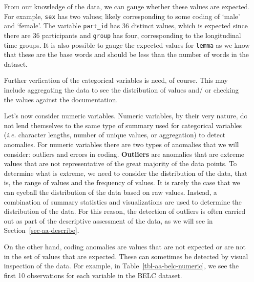 \documentclass[
  letterpaper,
  DIV=11,
  numbers=noendperiod]{scrreport}
\theoremstyle{definition}
\theoremstyle{remark}
\begin{document}
From our knowledge of the data, we can gauge whether these values are
expected. For example, \texttt{sex} has two values; likely corresponding
to some coding of `male' and `female'. The variable \texttt{part\_id}
has 36 distinct values, which is expected since there are 36
participants and \texttt{group} has four, corresponding to the
longitudinal time groups. It is also possible to gauge the expected
values for \texttt{lemma} as we know that these are the base words and
should be less than the number of words in the dataset.

Further verfication of the categorical variables is need, of course.
This may include aggregating the data to see the distribution of values
and/ or checking the values against the documentation.

Let's now consider numeric variables. Numeric variables, by their very
nature, do not lend themselves to the same type of summary used for
categorical variables (\emph{i.e.} character lengths, number of unique
values, or aggregation) to detect anomalies. For numeric variables there
are two types of anomalies that we will consider: outliers and errors in
coding. \textbf{Outliers} are anomalies that are extreme values that are
not representative of the great majority of the data points. To
determine what is extreme, we need to consider the distribution of the
data, that is, the range of values and the frequency of values. It is
rarely the case that we can eyeball the distribution of the data based
on raw values. Instead, a combination of summary statistics and
visualizations are used to determine the distribution of the data. For
this reason, the detection of outliers is often carried out as part of
the descriptive assessment of the data, as we will see in
Section~\ref{sec-aa-describe}.

On the other hand, coding anomalies are values that are not expected or
are not in the set of values that are expected. These can sometimes be
detected by visual inspection of the data. For example, in
Table~\ref{tbl-aa-belc-numeric}, we see the first 10 observations for
each variable in the BELC dataset.
\end{document}
